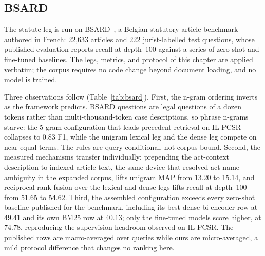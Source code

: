 \documentclass{mnnit}
\begin{document}
\subsection{BSARD}
The statute leg is run on
BSARD~\cite{louis2022bsard}, a Belgian
statutory-article benchmark authored in French: 22,633 articles
and 222 jurist-labelled test questions, whose published
evaluation reports recall at depth~100 against a series of
zero-shot and fine-tuned baselines. The legs, metrics, and
protocol of this chapter are applied verbatim; the corpus
requires no code change beyond document loading, and no model is
trained.

Three observations follow (Table~\ref{tab:bsard}). First, the
n-gram ordering inverts as the framework predicts. BSARD
questions are legal questions of a dozen tokens rather than
multi-thousand-token case descriptions, so phrase n-grams starve:
the 5-gram configuration that leads precedent retrieval on
IL-PCSR collapses to 0.83 F1, while the unigram lexical leg and
the dense leg compete on near-equal terms. The rules are
query-conditional, not corpus-bound. Second, the measured
mechanisms transfer individually: prepending the act-context
description to indexed article text, the same device that
resolved act-name ambiguity in the expanded corpus, lifts
unigram MAP from 13.20 to 15.14, and reciprocal rank fusion over
the lexical and dense legs lifts recall at depth~100 from 51.65
to 54.62. Third, the assembled configuration exceeds every
zero-shot baseline published for the benchmark, including its
best dense bi-encoder row at 49.41 and its own BM25 row at
40.13; only the fine-tuned models score higher, at 74.78,
reproducing the supervision headroom observed on IL-PCSR. The
published rows are macro-averaged over queries while ours are
micro-averaged, a mild protocol difference that changes no
ranking here.
\end{document}
